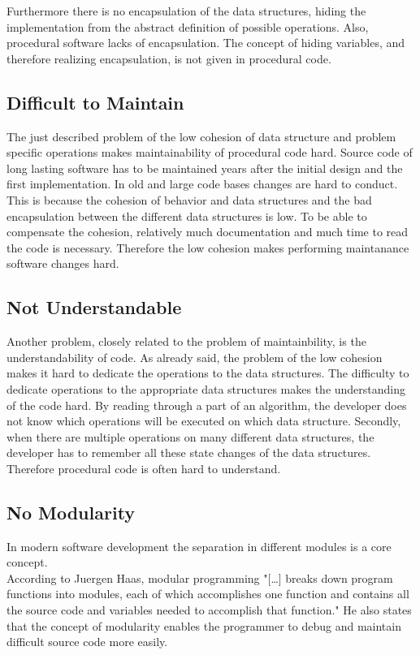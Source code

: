Furthermore there is no encapsulation of the data structures, hiding the implementation from the abstract definition of possible operations. Also, procedural software lacks of encapsulation. The concept of hiding variables, and therefore realizing encapsulation, is not given in procedural code. 

\subsection*{Difficult to Maintain}
\label{problem:maintainability}
The just described problem of the low cohesion of data structure and problem specific operations makes maintainability of procedural code hard. Source code of long lasting software has to be maintained years after the initial design and the first implementation. In old and large code bases changes are hard to conduct. This is because the cohesion of behavior and data structures and the bad encapsulation between the different data structures is low. To be able to compensate the cohesion, relatively much documentation and much time to read the code is necessary. Therefore the low cohesion makes performing maintanance software changes hard. 

\subsection*{Not Understandable}
Another problem, closely related to the problem of maintainbility, is the understandability of code. As already said, the problem of the low cohesion makes it hard to dedicate the operations to the data structures. The difficulty to dedicate operations to the appropriate data structures makes the understanding of the code hard. By  reading through a part of an algorithm, the developer does not know which operations will be executed on which data structure. Secondly, when there are multiple operations on many different data structures, the developer has to remember all these state changes of the data structures. Therefore procedural code is often hard to understand. 

\subsection*{No Modularity}
\label{problem:nomodularity}
In modern software development the separation in different modules is a core concept.\\

According to Juergen Haas, modular programming "[\dots{}] breaks down program functions into modules, each of which accomplishes one function and contains all the source code and variables needed to accomplish that function." \cite{about} He also states that the concept of modularity enables the programmer to debug and maintain difficult source code more easily. \\

